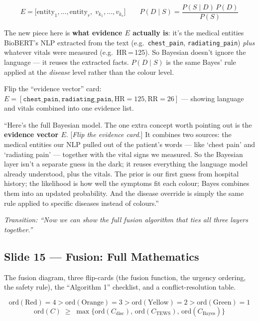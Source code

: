 \documentclass[11pt]{article}
\newcommand{\transition}[1]{\medskip\noindent\textit{\textcolor{mutel}{Transition: #1}}\medskip}
\newcommand{\route}[1]{{\small\texttt{\textcolor{mutel}{#1}}}}
\newcommand{\slide}[3]{%
  \subsection{Slide #1 --- #2}%
  \noindent\route{Route: #3}\par\smallskip}
\begin{document}
\[
E=\bigl[\text{entity}_1,\dots,\text{entity}_r,\; v_{k_1},\dots,v_{k_s}\bigr]
\qquad
P(D\mid S)=\frac{P(S\mid D)\,P(D)}{P(S)}
\]

\begin{idea}
The new piece here is \textbf{what evidence $E$ actually is}: it's the medical entities BioBERT's NLP
extracted from the text (e.g.\ \texttt{chest\_pain}, \texttt{radiating\_pain}) \emph{plus} whatever vitals
were measured (e.g.\ HR\,=\,125). So Bayesian doesn't ignore the language --- it reuses the extracted facts.
$P(D\mid S)$ is the same Bayes' rule applied at the \emph{disease} level rather than the colour level.
\end{idea}

\begin{demo}
Flip the ``evidence vector'' card: $E=[\texttt{chest\_pain}, \texttt{radiating\_pain}, \mathrm{HR}{=}125,
\mathrm{RR}{=}26]$ --- showing language and vitals combined into one evidence list.
\end{demo}

\begin{saybox}
``Here's the full Bayesian model. The one extra concept worth pointing out is the \textbf{evidence vector
$E$}. [\emph{Flip the evidence card}.] It combines two sources: the medical entities our NLP pulled out of
the patient's words --- like `chest pain' and `radiating pain' --- together with the vital signs we
measured. So the Bayesian layer isn't a separate guess in the dark; it reuses everything the language
model already understood, plus the vitals. The prior is our first guess from hospital history; the
likelihood is how well the symptoms fit each colour; Bayes combines them into an updated probability. And
the disease override is simply the same rule applied to specific diseases instead of colours.''
\end{saybox}

\transition{``Now we can show the full fusion algorithm that ties all three layers together.''}

\slide{15}{Fusion: Full Mathematics}{/dashboard/math/fusion}

\begin{onscreen}
The fusion diagram, three flip-cards (the fusion function, the urgency ordering, the safety rule), the
``Algorithm 1'' checklist, and a conflict-resolution table.
\end{onscreen}

\[
\mathrm{ord}(\text{Red})=4 > \mathrm{ord}(\text{Orange})=3 > \mathrm{ord}(\text{Yellow})=2 > \mathrm{ord}(\text{Green})=1
\]
\[
\mathrm{ord}(C)\;\ge\;\max\bigl\{\mathrm{ord}(C_{\mathrm{disc}}),\,\mathrm{ord}(C_{\mathrm{TEWS}}),\,\mathrm{ord}(C_{\mathrm{Bayes}})\bigr\}
\]
\end{document}
